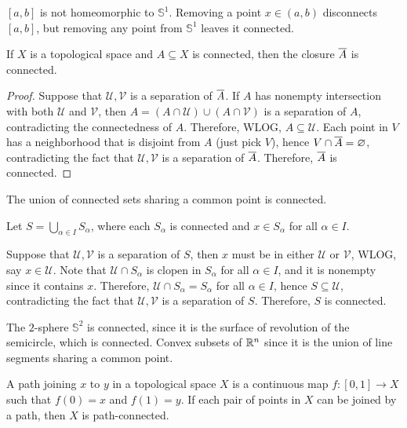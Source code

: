 \begin{rmk}
    $[a, b]$ is not homeomorphic to $\mathbb S^1$. Removing a point $x \in (a, b)$ disconnects $[a, b]$, but removing any point from $\mathbb S^1$ leaves it connected.
\end{rmk}

\begin{prop}
    If $X$ is a topological space and $A \subseteq X$ is connected, then the closure $\Bar A$ is connected.
    \begin{proof}
        Suppose that $\mathcal U, \mathcal V$ is a separation of $\Bar A$. If $A$ has nonempty intersection with both $\mathcal U$ and $\mathcal V$, then $A = (A \cap \mathcal U) \cup (A \cap \mathcal V)$ is a separation of $A$, contradicting the connectedness of $A$. Therefore, WLOG, $A \subseteq \mathcal U$. Each point in $V$ has a neighborhood that is disjoint from $A$ (just pick $V$), hence $V \cap \Bar A = \emptyset$, contradicting the fact that $\mathcal U, \mathcal V$ is a separation of $\Bar A$. Therefore, $\Bar A$ is connected.
    \end{proof}
\end{prop}

\begin{prop}
    The union of connected sets sharing a common point is connected.
    \begin{pf}
        Let $S = \bigcup_{\alpha \in I} S_\alpha$, where each $S_\alpha$ is connected and $x \in S_\alpha$ for all $\alpha \in I$. 
        
        Suppose that $\mathcal U, \mathcal V$ is a separation of $S$, then $x$ must be in either $\mathcal U$ or $\mathcal V$, WLOG, say $x \in \mathcal U$. Note that $\mathcal U \cap S_\alpha$ is clopen in $S_\alpha$ for all $\alpha \in I$, and it is nonempty since it contains $x$. Therefore, $\mathcal U \cap S_\alpha = S_\alpha$ for all $\alpha \in I$, hence $S \subseteq \mathcal U$, contradicting the fact that $\mathcal U, \mathcal V$ is a separation of $S$. Therefore, $S$ is connected.
    \end{pf}
\end{prop}

\begin{ex}
    The $2$-sphere $\mathbb S^2$ is connected, since it is the surface of revolution of the semicircle, which is connected. Convex subsets of $\R^n$ since it is the union of line segments sharing a common point.
\end{ex}

\begin{df}
    A path joining $x$ to $y$ in a topological space $X$ is a continuous map $f: [0, 1] \to X$ such that $f(0) = x$ and $f(1) = y$. If each pair of points in $X$ can be joined by a path, then $X$ is path-connected.
\end{df}

